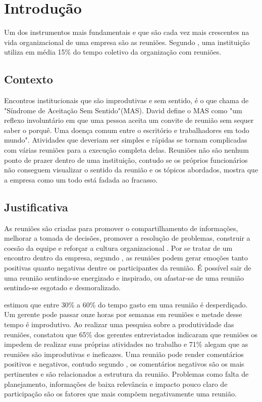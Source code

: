 \chapter[Introdução]{Introdução}
\label{cp:introducao}

Um dos instrumentos mais fundamentais e que são cada vez mais crescentes na vida organizacional de uma empresa são as reuniões. Segundo \cite{allen2016}, uma instituição utiliza em média 15\% do tempo coletivo da organização com reuniões.

\section{Contexto}
\label{sec:contexto}

Encontros institucionais que são improdutivas e sem sentido, é o que \cite{davidgrady} chama de "Síndrome de Aceitação Sem Sentido"(MAS). David define o MAS como "um reflexo involuntário em que uma pessoa aceita um convite de reunião sem sequer saber o porquê. Uma doença comum entre o escritório e trabalhadores em todo mundo". Atividades que deveriam ser simples e rápidas se tornam complicadas com várias reuniões para a execução completa delas. Reuniões não são nenhum ponto de prazer dentro de uma instituição, contudo se os próprios funcionários não conseguem visualizar o sentido da reunião e os tópicos abordados, mostra que a empresa como um todo está fadada ao fracasso.

\section{Justificativa}
\label{sec:justificativa}

As reuniões são criadas para promover o compartilhamento de informações, melhorar a tomada de decisões, promover a resolução de problemas, construir a coesão da equipe e reforçar a cultura organizacional \cite{leach}. Por se tratar de um encontro dentro da empresa, segundo \cite{leach}, as reuniões podem gerar emoções tanto positivas quanto negativas dentre os participantes da reunião. É possível sair de uma reunião sentindo-se energizado e inspirado, ou afastar-se de uma reunião sentindo-se esgotado e desmoralizado.  

\cite{macleod} estimou que entre 30\% a 60\% do tempo gasto em uma reunião é desperdiçado. Um gerente pode passar onze horas por semanas em reuniões e metade desse tempo é improdutivo. Ao realizar uma pesquisa sobre a produtividade das reuniões, \cite{perlow} constatou que 65\% dos gerentes entrevistados indicaram que reuniões os impedem de realizar suas próprias atividades no trabalho e 71\% alegam que as reuniões são improdutivas e ineficazes. Uma reunião pode render comentários positivos e negativos, contudo segundo \cite{leach}, os comentários negativos são os mais pertinentes e são relacionados a estrutura da reunião. Problemas como falta de planejamento, informações de baixa relevância e impacto pouco claro de participação são os fatores que mais compõem negativamente uma reunião.

